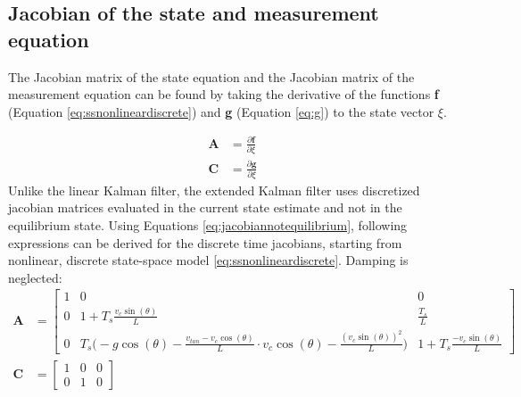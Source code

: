 \documentclass[a4paper,kul]{kulakarticle} %
\begin{document}
\subsection{Jacobian of the state and measurement equation}
The Jacobian matrix of the state equation and the Jacobian matrix of the measurement equation can be found by taking the derivative of the functions \textbf{f} (Equation \ref{eq:ssnonlineardiscrete}) and \textbf{g} (Equation \ref{eq:g}) to the state vector $\xi$.

\begin{equation}
\begin{split}
\mathbf{A} &= \frac{\partial \mathbf{f}}{\partial \xi}\\
\mathbf{C} &= \frac{\partial \mathbf{g}}{\partial \xi}
\end{split}	
\label{eq:jacobiannotequilibrium}
\end{equation}
Unlike the linear Kalman filter, the extended Kalman filter uses discretized jacobian matrices evaluated in the current state estimate and not in the equilibrium state. Using Equations \ref{eq:jacobiannotequilibrium}, following expressions can be derived for the discrete time jacobians, starting from nonlinear, discrete state-space model \ref{eq:ssnonlineardiscrete}. Damping is neglected: 
\begin{equation}
\begin{split}
\mathbf{A} &= \begin{bmatrix}
1&0&0\\0&1+T_s\frac{v_c\sin(\theta)}{L}&\frac{T_s}{L}\\0&T_s\bigg(-g\cos(\theta) - \frac{v_{tan}-v_c\cos(\theta)}{L} \cdot v_c \cos(\theta)-\frac{(v_c\sin(\theta))^2}{L}\bigg)&1+T_s\frac{-v_c\sin(\theta)}{L}
\end{bmatrix}\\
\mathbf{C} &= \begin{bmatrix}
1&0&0\\0&1&0
\end{bmatrix}
\end{split}
\end{equation}
\end{document}
